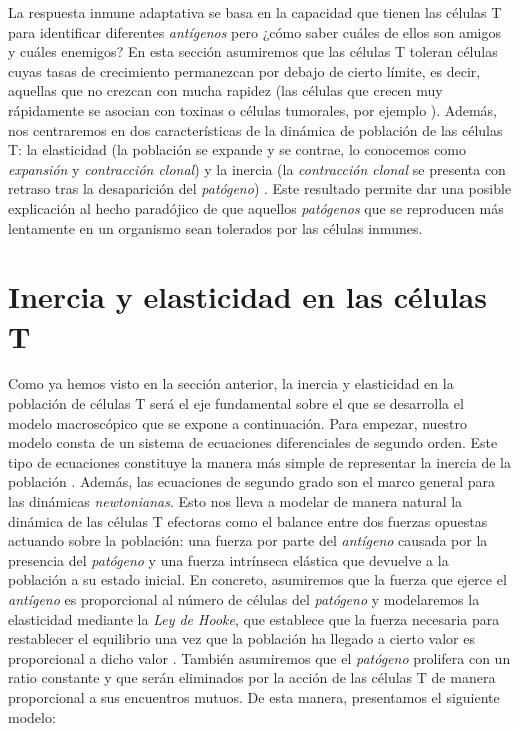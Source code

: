 La respuesta inmune adaptativa se basa en la capacidad que tienen las células T para identificar diferentes \textit{antígenos} pero ¿cómo saber cuáles de ellos son amigos y cuáles enemigos? En esta sección asumiremos que las células T toleran células cuyas tasas de crecimiento permanezcan por debajo de cierto límite, es decir, aquellas que no crezcan con mucha rapidez (las células que crecen muy rápidamente se asocian con toxinas o células tumorales, por ejemplo \citep{arias2015growth}). Además, nos centraremos en dos características de la dinámica de población de las células T: la elasticidad (la población se expande y se contrae, lo conocemos como \textit{expansión} y \textit{contracción clonal}) y la inercia (la \textit{contracción clonal} se presenta con retraso tras la desaparición del \textit{patógeno}) \citep{arias2015growth}. Este resultado permite dar una posible explicación al hecho paradójico de que aquellos \textit{patógenos} que se reproducen más lentamente en un organismo sean tolerados por las células inmunes.


\section{Inercia y elasticidad en las células T}

Como ya hemos visto en la sección anterior, la inercia y elasticidad en la población de células T será el eje fundamental sobre el que se desarrolla el modelo macroscópico que se expone a continuación. Para empezar, nuestro modelo consta de un sistema de ecuaciones diferenciales de segundo orden. Este tipo de ecuaciones constituye la manera más simple de representar la inercia de la población \citep{arias2015growth}. Además, las ecuaciones de segundo grado son el marco general para las dinámicas \textit{newtonianas}. Esto nos lleva a modelar de manera natural la dinámica de las células T efectoras como el balance entre dos fuerzas opuestas actuando sobre la población: una fuerza por parte del \textit{antígeno} causada por la presencia del \textit{patógeno} y una fuerza intrínseca elástica que devuelve a la población a su estado inicial. En concreto, asumiremos que la fuerza que ejerce el \textit{antígeno} es proporcional al número de células del \textit{patógeno} y modelaremos la elasticidad mediante la \textit{Ley de Hooke}, que establece que la fuerza necesaria para restablecer el equilibrio una vez que la población ha llegado a cierto valor es proporcional a dicho valor \citep{arias2015growth}. También asumiremos que el \textit{patógeno} prolifera con un ratio constante y que serán eliminados por la acción de las células T de manera proporcional a sus encuentros mutuos. De esta manera, presentamos el siguiente modelo:

